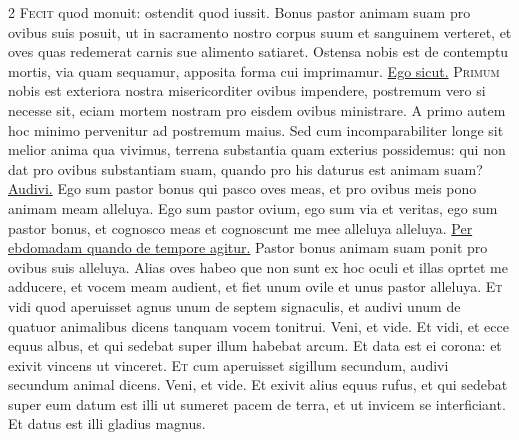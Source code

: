 \begin{multicols*}{2}
\lettrine[lines=2]{\zallmancaps \color{Red} F}{ecit} quod monuit: ostendit quod iussit. Bonus pastor animam suam pro ovibus suis posuit, ut in sacramento nostro corpus suum et sanguinem verteret, et oves quas redemerat carnis sue alimento satiaret. Ostensa nobis est de contemptu mortis, via quam sequamur, apposita forma cui imprimamur. \R \hyperlink{ego-sicut}{Ego sicut.}
\lettrine[lines=2]{\zallmancaps \color{Blue} P}{rimum} nobis est exteriora nostra misericorditer ovibus impendere, postremum vero si necesse sit, eciam mortem
nostram pro eisdem ovibus ministrare. A primo autem hoc minimo pervenitur ad postremum maius. Sed cum incomparabiliter longe sit melior anima qua vivimus, terrena substantia quam exterius possidemus: qui non dat pro ovibus substantiam suam, quando pro his daturus est animam suam? \R \hyperlink{audivi-vocem-tanquam}{Audivi.}
 Ego sum pastor bonus qui pasco oves meas, et pro ovibus meis pono animam meam alleluya.
 Ego sum pastor ovium, ego sum via et veritas, ego sum pastor bonus, et cognosco meas et cognoscunt me mee alleluya alleluya.%
\newline \ul{Per ebdomadam quando de tempore agitur.}
 Pastor bonus animam suam ponit pro ovibus suis alleluya.
 Alias oves habeo que non sunt ex hoc oculi et illas oprtet me adducere, et vocem meam audient, et fiet unum ovile et unus pastor alleluya.
\lettrine[lines=2]{\zallmancaps \color{Red} E}{t} vidi quod aperuisset agnus unum de septem signaculis, et audivi unum de quatuor animalibus dicens tanquam vocem tonitrui. Veni, et vide. Et vidi, et ecce equus albus, et qui sedebat super illum habebat arcum. Et data est ei corona: et exivit vincens ut vinceret.
\lettrine[lines=2]{\zallmancaps \color{Blue} E}{t} cum aperuisset sigillum secundum, audivi secundum animal dicens. Veni, et vide. Et exivit alius equus rufus, et qui sedebat super eum datum est illi ut sumeret pacem de terra, et ut invicem se interficiant. Et datus est illi gladius magnus.

\end{multicols*}
